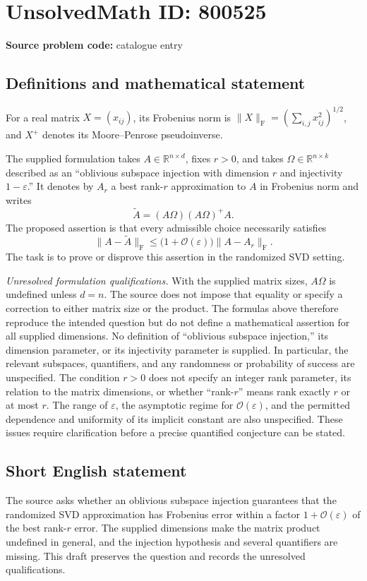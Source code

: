 \documentclass[11pt]{article}
\newcommand{\R}{\mathbb{R}}
\begin{document}
\section*{UnsolvedMath ID: 800525}
\textbf{Source problem code:} catalogue entry
\subsection{Definitions and mathematical statement}
For a real matrix \(X=(x_{ij})\), its Frobenius norm is \(\|X\|_{\mathrm F}=(\sum_{i,j}x_{ij}^{2})^{1/2}\), and \(X^{+}\) denotes its Moore--Penrose pseudoinverse.

The supplied formulation takes \(A\in\R^{n\times d}\), fixes \(r>0\), and takes \(\Omega\in\R^{n\times k}\) described as an ``oblivious subspace injection with dimension \(r\) and injectivity \(1-\varepsilon\).'' It denotes by \(A_r\) a best rank-\(r\) approximation to \(A\) in Frobenius norm and writes
\[
\widetilde A=(A\Omega)(A\Omega)^{+}A.
\]
The proposed assertion is that every admissible choice necessarily satisfies
\[
\|A-\widetilde A\|_{\mathrm F}
\leq \bigl(1+\mathcal O(\varepsilon)\bigr)\|A-A_r\|_{\mathrm F}.
\]
The task is to prove or disprove this assertion in the randomized SVD setting.

\emph{Unresolved formulation qualifications.} With the supplied matrix sizes, \(A\Omega\) is undefined unless \(d=n\). The source does not impose that equality or specify a correction to either matrix size or the product. The formulas above therefore reproduce the intended question but do not define a mathematical assertion for all supplied dimensions. No definition of ``oblivious subspace injection,'' its dimension parameter, or its injectivity parameter is supplied. In particular, the relevant subspaces, quantifiers, and any randomness or probability of success are unspecified. The condition \(r>0\) does not specify an integer rank parameter, its relation to the matrix dimensions, or whether ``rank-\(r\)'' means rank exactly \(r\) or at most \(r\). The range of \(\varepsilon\), the asymptotic regime for \(\mathcal O(\varepsilon)\), and the permitted dependence and uniformity of its implicit constant are also unspecified. These issues require clarification before a precise quantified conjecture can be stated.
\subsection{Short English statement}
The source asks whether an oblivious subspace injection guarantees that the randomized SVD approximation has Frobenius error within a factor \(1+\mathcal O(\varepsilon)\) of the best rank-\(r\) error. The supplied dimensions make the matrix product undefined in general, and the injection hypothesis and several quantifiers are missing. This draft preserves the question and records the unresolved qualifications.
\end{document}
